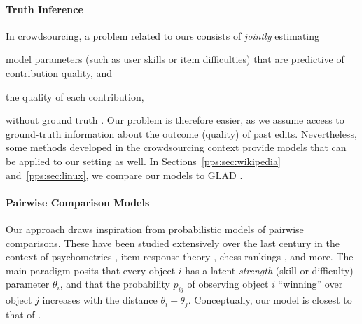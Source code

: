 \paragraph{Truth Inference}
In crowdsourcing, a problem related to ours consists of \emph{jointly} estimating
\begin{enuminline}
	\item model parameters (such as user skills or item difficulties) that are predictive of contribution quality, and
	\item the quality of each contribution,
\end{enuminline}
without ground truth \citep{dawid1979maximum}.
Our problem is therefore easier, as we assume access to ground-truth information about the outcome (quality) of past edits.
Nevertheless, some methods developed in the crowdsourcing context \citep{whitehill2009whose, welinder2010multidimensional, zhou2012learning} provide models that can be applied to our setting as well.
In Sections~\ref{pps:sec:wikipedia} and~\ref{pps:sec:linux}, we compare our models to GLAD \citep{whitehill2009whose}.


\paragraph{Pairwise Comparison Models}
Our approach draws inspiration from probabilistic models of pairwise comparisons.
These have been studied extensively over the last century in the context of psychometrics \citep{thurstone1927law, bradley1952rank}, item response theory \citep{rasch1960probabilistic}, chess rankings \citep{zermelo1928berechnung, elo1978rating}, and more.
The main paradigm posits that every object $i$ has a latent \emph{strength} (skill or difficulty) parameter $\theta_i$, and that the probability $p_{ij}$ of observing object $i$ ``winning'' over object $j$ increases with the distance $\theta_i - \theta_j$.
Conceptually, our model is closest to that of \citet{rasch1960probabilistic}.

